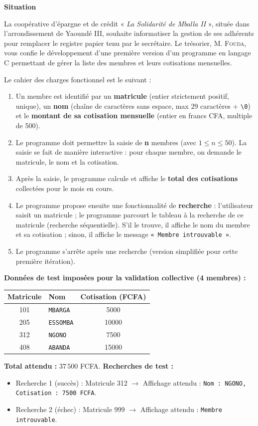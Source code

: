 \documentclass[11pt]{article}
\begin{document}
\textbf{Situation}\par
La coopérative d'épargne et de crédit « \emph{La Solidarité de Mballa II} », située dans l'arrondissement de Yaoundé III, souhaite informatiser la gestion de ses adhérents pour remplacer le registre papier tenu par le secrétaire. Le trésorier, M. \textsc{Fouda}, vous confie le développement d'une première version d'un programme en langage C permettant de gérer la liste des membres et leurs cotisations mensuelles.

Le cahier des charges fonctionnel est le suivant :
\begin{enumerate}
    \item Un membre est identifié par un \textbf{matricule} (entier strictement positif, unique), un \textbf{nom} (chaîne de caractères sans espace, max 29 caractères + \texttt{\textbackslash 0}) et le \textbf{montant de sa cotisation mensuelle} (entier en francs CFA, multiple de 500).
    \item Le programme doit permettre la saisie de \textbf{n} membres (avec $1 \le n \le 50$). La saisie se fait de manière interactive : pour chaque membre, on demande le matricule, le nom et la cotisation.
    \item Après la saisie, le programme calcule et affiche le \textbf{total des cotisations} collectées pour le mois en cours.
    \item Le programme propose ensuite une fonctionnalité de \textbf{recherche} : l'utilisateur saisit un matricule ; le programme parcourt le tableau à la recherche de ce matricule (recherche séquentielle). S'il le trouve, il affiche le nom du membre et sa cotisation ; sinon, il affiche le message \texttt{« Membre introuvable »}.
    \item Le programme s'arrête après une recherche (version simplifiée pour cette première itération).
\end{enumerate}

\textbf{Données de test imposées pour la validation collective (4 membres) :}
\begin{center}
\begin{tabularx}{\linewidth}{|c|X|c|}
\hline
\rowcolor{popblueL}
\textbf{Matricule} & \textbf{Nom} & \textbf{Cotisation (FCFA)} \\
\hline
101 & \texttt{MBARGA} & 5000 \\
205 & \texttt{ESSOMBA} & 10000 \\
312 & \texttt{NGONO} & 7500 \\
408 & \texttt{ABANDA} & 15000 \\
\hline
\end{tabularx}
\end{center}
\textbf{Total attendu :} $37\,500$ FCFA.
\textbf{Recherches de test :}
\begin{itemize}
    \item Recherche 1 (succès) : Matricule 312 $\to$ Affichage attendu : \texttt{Nom : NGONO, Cotisation : 7500 FCFA}.
    \item Recherche 2 (échec) : Matricule 999 $\to$ Affichage attendu : \texttt{Membre introuvable}.
\end{itemize}
\end{document}
